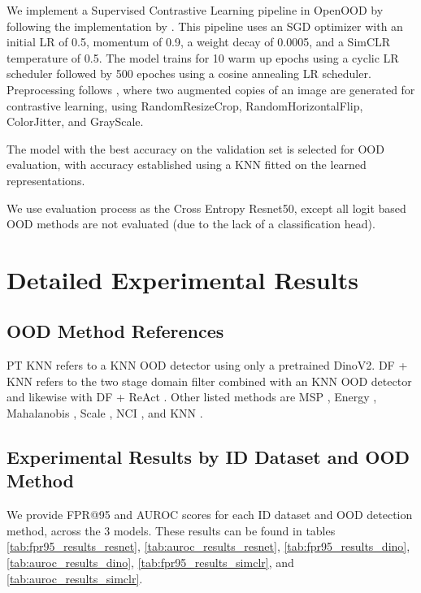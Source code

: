 \documentclass[letterpaper]{article} %
\theoremstyle{plain}
\theoremstyle{definition}
\theoremstyle{remark}
\begin{document}
We implement a Supervised Contrastive Learning pipeline in OpenOOD by following the implementation by \cite{sehwag2021ssd}. This pipeline uses an SGD optimizer with an initial LR of 0.5, momentum of 0.9, a weight decay of 0.0005, and a SimCLR temperature of 0.5. The model trains for 10 warm up epochs using a cyclic LR scheduler followed by 500 epoches using a cosine annealing LR scheduler. Preprocessing follows \citep{sehwag2021ssd}, where two augmented copies of an image are generated for contrastive learning, using RandomResizeCrop, RandomHorizontalFlip, ColorJitter, and GrayScale. 

The model with the best accuracy on the validation set is selected for OOD evaluation, with accuracy established using a KNN fitted on the learned representations. 

We use evaluation process as the Cross Entropy Resnet50, except all logit based OOD methods are not evaluated (due to the lack of a classification head).




\section{Detailed Experimental Results}


\label{expresult}

\subsection{OOD Method References}

\label{oodref}
PT KNN refers to a KNN OOD detector \citep{sun2022out} using only a pretrained DinoV2. DF + KNN refers to the two stage domain filter combined with an KNN OOD detector \citep{sun2022out} and likewise with DF + ReAct \citep{sun2021react}. Other listed methods are MSP \citep{hendrycks2016baseline}, Energy \citep{liu2020energy}, Mahalanobis \citep{lee2018simple}, Scale \citep{xuscaling}, NCI \citep{liu2025detecting}, and KNN \citep{sun2022out}.



\subsection{Experimental Results by ID Dataset and OOD Method }

We provide FPR@95 and AUROC scores for each ID dataset and OOD detection method, across the 3 models. These results can be found in tables \ref{tab:fpr95_results_resnet},  \ref{tab:auroc_results_resnet}, \ref{tab:fpr95_results_dino}, \ref{tab:auroc_results_dino}, \ref{tab:fpr95_results_simclr}, and \ref{tab:auroc_results_simclr}.
\end{document}
